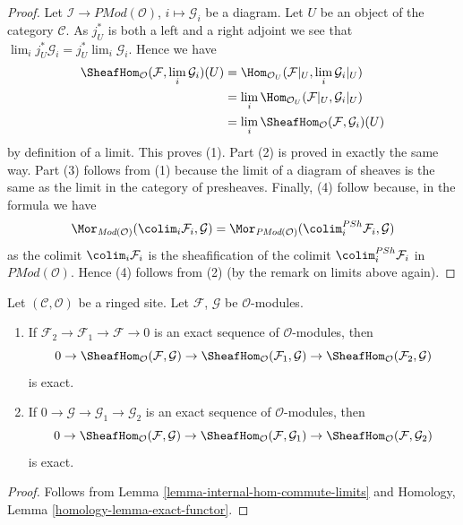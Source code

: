 \begin{proof}
Let $\mathcal{I} \to \textit{PMod}(\mathcal{O})$, $i \mapsto \mathcal{G}_i$
be a diagram. Let $U$ be an object of the category $\mathcal{C}$.
As $j_U^*$ is both a left and a right adjoint we see that
$\lim_i j_U^*\mathcal{G}_i = j_U^* \lim_i \mathcal{G}_i$.
Hence we have
\begin{align*}
\SheafHom_\mathcal{O}(\mathcal{F}, \lim_i \mathcal{G}_i)(U)
& =
\Hom_{\mathcal{O}_U}(\mathcal{F}|_U, \lim_i \mathcal{G}_i|_U) \\
& =
\lim_i \Hom_{\mathcal{O}_U}(\mathcal{F}|_U, \mathcal{G}_i|_U) \\
& = \lim_i \SheafHom_\mathcal{O}(\mathcal{F}, \mathcal{G}_i)(U)
\end{align*}
by definition of a limit. This proves (1). Part (2) is proved in exactly the
same way. Part (3) follows from (1) because the limit of a diagram of sheaves
is the same as the limit in the category of presheaves.
Finally, (4) follow because, in the formula we have
$$
\Mor_{\textit{Mod}(\mathcal{O})}(
\colim_i \mathcal{F}_i, \mathcal{G})
=
\Mor_{\textit{PMod}(\mathcal{O})}(
\colim^{PSh}_i \mathcal{F}_i, \mathcal{G})
$$
as the colimit $\colim_i \mathcal{F}_i$ is the sheafification of
the colimit $\colim^{PSh}_i \mathcal{F}_i$ in
$\textit{PMod}(\mathcal{O})$. Hence (4) follows from (2)
(by the remark on limits above again).
\end{proof}

\begin{lemma}
\label{lemma-internal-hom-exact}
Let $(\mathcal{C}, \mathcal{O})$ be a ringed site.
Let $\mathcal{F}$, $\mathcal{G}$ be $\mathcal{O}$-modules.
\begin{enumerate}
\item If $\mathcal{F}_2 \to \mathcal{F}_1 \to \mathcal{F} \to 0$
is an exact sequence of $\mathcal{O}$-modules, then
$$
0 \to
\SheafHom_\mathcal{O}(\mathcal{F}, \mathcal{G}) \to
\SheafHom_\mathcal{O}(\mathcal{F}_1, \mathcal{G}) \to
\SheafHom_\mathcal{O}(\mathcal{F}_2, \mathcal{G})
$$
is exact.
\item If $0 \to \mathcal{G} \to \mathcal{G}_1 \to \mathcal{G}_2$
is an exact sequence of $\mathcal{O}$-modules, then
$$
0 \to
\SheafHom_\mathcal{O}(\mathcal{F}, \mathcal{G}) \to
\SheafHom_\mathcal{O}(\mathcal{F}, \mathcal{G}_1) \to
\SheafHom_\mathcal{O}(\mathcal{F}, \mathcal{G}_2)
$$
is exact.
\end{enumerate}
\end{lemma}

\begin{proof}
Follows from Lemma \ref{lemma-internal-hom-commute-limits} and
Homology, Lemma \ref{homology-lemma-exact-functor}.
\end{proof}

